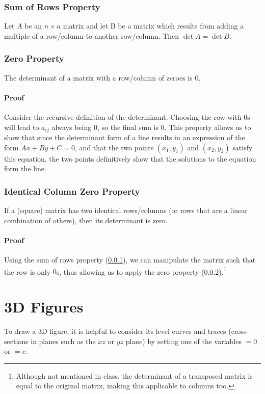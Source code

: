 \documentclass{article}
\begin{document}
\subsubsection{Sum of Rows Property} \label{det-sum-rows}
Let $A$ be an $n\times n$ matrix and let B be a matrix which results from adding a multiple of a row/column to another row/column. Then $\det{A} = \det{B}$.

\subsubsection{Zero Property}\label{det-zero}
The determinant of a matrix with a row/column of zeroes is $0$.

\paragraph{Proof} Consider the recursive definition of the determinant. Choosing the row with $0$s will lead to $a_{ij}$ always being $0$, so the final sum is 0.
This property allows us to show that since the determinant form of a line results in an expression of the form $Ax+By+C=0$, and that the two points $(x_1,y_1)$ and $(x_2,y_2)$ satisfy this equation, the two points definitively show that the solutions to the equation form the line.

\subsubsection{Identical Column Zero Property}
If a (square) matrix has two identical rows/columns (or rows that are a linear combination of others), then its determinant is zero.

\paragraph{Proof} Using the sum of rows property (\ref{det-sum-rows}), we can manipulate the matrix such that the row is only $0$s, thus allowing us to apply the zero property (\ref{det-zero}).\footnote{Although not mentioned in class, the determinant of a transposed matrix is equal to the original matrix, making this applicable to columns too.}

\section{3D Figures}
To draw a 3D figure, it is helpful to consider its level curves and traces (cross-sections in planes such as the $xz$ or $yz$ plane) by setting one of the variables $=0$ or $=c$.
\end{document}
